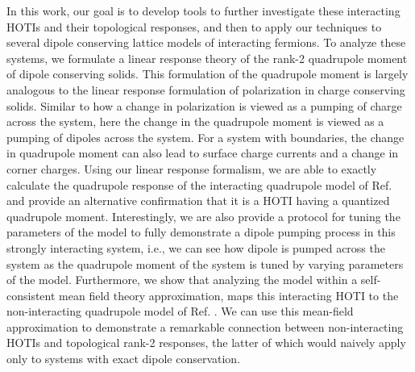 \documentclass[prb,aps,twocolumn,groupaddress,floatfix]{revtex4-1}
\begin{document}
In this work, our goal is to develop tools to further investigate these interacting HOTIs and their topological responses, and then to apply our techniques to several dipole conserving lattice models of interacting fermions. To analyze these systems, we formulate a linear response theory of the rank-2 quadrupole moment of dipole conserving solids. This formulation of the quadrupole moment is largely analogous to the linear response formulation of polarization in charge conserving solids\cite{resta2007}. Similar to how a change in polarization is viewed as a pumping of charge across the system, here the change in the quadrupole moment is viewed as a pumping of dipoles across the system. For a system with boundaries, the change in quadrupole moment can also lead to surface charge currents and a change in corner charges.  Using our linear response formalism, we are able to exactly calculate the quadrupole response of the interacting quadrupole model of Ref.  and provide an alternative confirmation that it is a HOTI having a quantized quadrupole moment. Interestingly, we are also provide a protocol for tuning the parameters of the model to fully demonstrate a dipole pumping process in this strongly interacting system, i.e., we can see how dipole is pumped across the system as the quadrupole moment of the system is tuned by varying parameters of the model.  Furthermore, we show that analyzing the model within a self-consistent mean field theory approximation, maps this interacting HOTI to the non-interacting quadrupole model of Ref. . We can use this mean-field approximation to demonstrate a remarkable connection between non-interacting HOTIs and topological rank-2 responses, the latter of which would naively apply only to systems with exact dipole conservation. 
\end{document}
